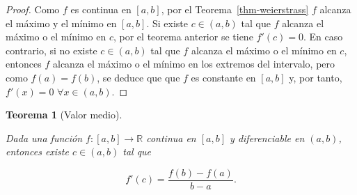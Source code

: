 \documentclass[
  a4paper,
]{scrreport}
\theoremstyle{definition}
\theoremstyle{definition}
\theoremstyle{definition}
\theoremstyle{plain}
\newtheorem{theorem}{Teorema}[chapter]
\theoremstyle{plain}
\theoremstyle{plain}
\theoremstyle{remark}
\begin{document}
\begin{tcolorbox}[enhanced jigsaw, bottomtitle=1mm, title=\textcolor{quarto-callout-note-color}{\faInfo}\hspace{0.5em}{Demostración}, colbacktitle=quarto-callout-note-color!10!white, coltitle=black, leftrule=.75mm, colback=white, toptitle=1mm, toprule=.15mm, titlerule=0mm, opacitybacktitle=0.6, colframe=quarto-callout-note-color-frame, bottomrule=.15mm, arc=.35mm, rightrule=.15mm, breakable, left=2mm, opacityback=0]

\begin{proof}
Como \(f\) es continua en \([a,b]\), por el
Teorema~\ref{thm-weierstrass} \(f\) alcanza el máximo y el mínimo en
\([a,b]\). Si existe \(c\in (a,b)\) tal que \(f\) alcanza el máximo o el
mínimo en \(c\), por el teorema anterior se tiene \(f'(c)=0\). En caso
contrario, si no existe \(c\in(a,b)\) tal que \(f\) alcanza el máximo o
el mínimo en \(c\), entonces \(f\) alcanza el máximo o el mínimo en los
extremos del intervalo, pero como \(f(a)=f(b)\), se deduce que que \(f\)
es constante en \([a,b]\) y, por tanto, \(f'(x)=0\)
\(\forall x\in (a,b)\).
\end{proof}

\end{tcolorbox}

\begin{theorem}[Valor
medio]\protect\hypertarget{thm-valor-medio}{}\label{thm-valor-medio}

Dada una función \(f:[a,b]\to\mathbb{R}\) continua en \([a,b]\) y
diferenciable en \((a,b)\), entonces existe \(c\in (a,b)\) tal que

\[
f'(c) = \frac{f(b)-f(a)}{b-a}.
\]

\end{theorem}
\end{document}
